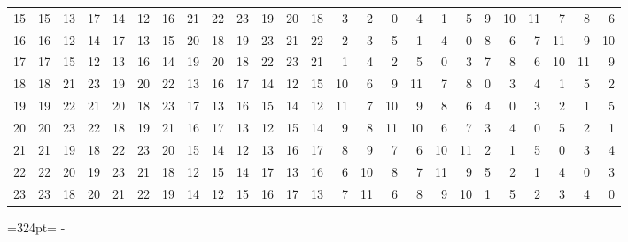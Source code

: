 \documentclass[10pt,a4paper]{article}
\newcommand{\needspace}[1]{\par\penalty-100\begingroup\dimen0=#1\relax\dimen2=\pagegoal
  \advance\dimen2-\pagetotal\ifdim\dimen0>\dimen2\relax\ifdim\dimen2>0pt\vfil\break\fi\fi
  \endgroup}
\numberwithin{equation}{section}
\begin{document}
{\begin{longtable}{@{}r|rrrrrrrrrrrrrrrrrrrrrrrr@{}}
15 & 15 & 13 & 17 & 14 & 12 & 16 & 21 & 22 & 23 & 19 & 20 & 18 & 3 & 2 & 0 & 4 & 1 & 5 & 9 & 10 & 11 & 7 & 8 & 6\\
16 & 16 & 12 & 14 & 17 & 13 & 15 & 20 & 18 & 19 & 23 & 21 & 22 & 2 & 3 & 5 & 1 & 4 & 0 & 8 & 6 & 7 & 11 & 9 & 10\\
17 & 17 & 15 & 12 & 13 & 16 & 14 & 19 & 20 & 18 & 22 & 23 & 21 & 1 & 4 & 2 & 5 & 0 & 3 & 7 & 8 & 6 & 10 & 11 & 9\\
18 & 18 & 21 & 23 & 19 & 20 & 22 & 13 & 16 & 17 & 14 & 12 & 15 & 10 & 6 & 9 & 11 & 7 & 8 & 0 & 3 & 4 & 1 & 5 & 2\\
19 & 19 & 22 & 21 & 20 & 18 & 23 & 17 & 13 & 16 & 15 & 14 & 12 & 11 & 7 & 10 & 9 & 8 & 6 & 4 & 0 & 3 & 2 & 1 & 5\\
20 & 20 & 23 & 22 & 18 & 19 & 21 & 16 & 17 & 13 & 12 & 15 & 14 & 9 & 8 & 11 & 10 & 6 & 7 & 3 & 4 & 0 & 5 & 2 & 1\\
21 & 21 & 19 & 18 & 22 & 23 & 20 & 15 & 14 & 12 & 13 & 16 & 17 & 8 & 9 & 7 & 6 & 10 & 11 & 2 & 1 & 5 & 0 & 3 & 4\\
22 & 22 & 20 & 19 & 23 & 21 & 18 & 12 & 15 & 14 & 17 & 13 & 16 & 6 & 10 & 8 & 7 & 11 & 9 & 5 & 2 & 1 & 4 & 0 & 3\\*
23 & 23 & 18 & 20 & 21 & 22 & 19 & 14 & 12 & 15 & 16 & 17 & 13 & 7 & 11 & 6 & 8 & 9 & 10 & 1 & 5 & 2 & 3 & 4 & 0\\
\bottomrule\end{longtable}}
\needspace{324pt}
\end{document}
